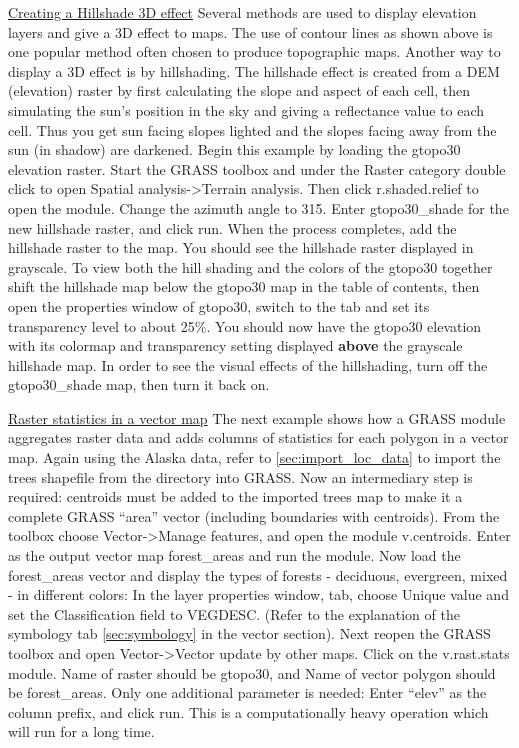 \underline{Creating a Hillshade 3D effect}
Several methods are used to display elevation layers and give a 3D effect to maps. The use of contour lines as shown above is one popular method often chosen to produce topographic maps. Another way to display a 3D effect is by hillshading. The hillshade effect is created from a DEM (elevation) raster by first calculating the slope and aspect of each cell, then simulating the sun's position in the sky and giving a reflectance value to each cell. Thus you get sun facing slopes lighted and the slopes facing away from the sun (in shadow) are darkened.
Begin this example by loading the gtopo30 elevation raster. Start the GRASS toolbox and under the Raster category double click to open Spatial analysis->Terrain analysis. Then click r.shaded.relief to open the module. Change the azimuth angle to 315. Enter gtopo30_shade for the new hillshade raster, and click run. When the process completes, add the hillshade raster to the map. You should see the hillshade raster displayed in grayscale. To view both the hill shading and the colors of the gtopo30 together shift the hillshade map below the gtopo30 map in the table of contents, then open the properties window of gtopo30, switch to the  tab and set its transparency level to about 25\%. You should now have the gtopo30 elevation with its colormap and transparency setting displayed \textbf{above} the grayscale hillshade map. In order to see the visual effects of the hillshading, turn off the gtopo30_shade map, then turn it back on.

\underline{Raster statistics in a vector map}
The next example shows how a GRASS module aggregates raster data and adds columns of statistics for each polygon in a vector map. Again using the Alaska data, refer to \ref{sec:import_loc_data} to import the trees shapefile from the  directory into GRASS.  Now an intermediary step is required: centroids must be added to the imported trees map to make it a complete GRASS ``area'' vector (including boundaries with centroids).  From the toolbox choose Vector->Manage features, and open the module v.centroids. Enter as the output vector map forest_areas and run the module.  Now load the forest_areas vector and display the types of forests - deciduous, evergreen, mixed - in different colors: In the layer properties window,  tab, choose Unique value and set the Classification field to VEGDESC. (Refer to the explanation of the symbology tab \ref{sec:symbology} in the vector section).
Next reopen the GRASS toolbox and open Vector->Vector update by other maps. Click on the v.rast.stats module. Name of raster should be gtopo30, and Name of vector polygon should be forest_areas. Only one additional parameter is needed: Enter ``elev'' as the column prefix, and click run. This is a computationally heavy operation which will run for a long time.




